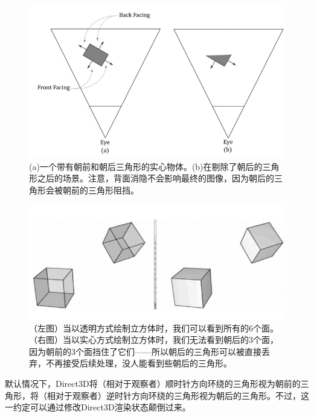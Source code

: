 \documentclass[11pt,a4paper,oldfontcommands]{memoir}
\begin{document}
{\begin{figure}[h]
	\includegraphics[width=\textwidth]{5-31}
	\centering
	\caption{(a)一个带有朝前和朝后三角形的实心物体。(b)在剔除了朝后的三角形之后的场景。注意，背面消隐不会影响最终的图像，因为朝后的三角形会被朝前的三角形阻挡。}
	\label{fig:5-31}
\end{figure}
\begin{figure}[h]
	\includegraphics[width=\textwidth]{5-32}
	\centering
	\caption{（左图）当以透明方式绘制立方体时，我们可以看到所有的6个面。（右图）当以实心方式绘制立方体时，我们无法看到朝后的3个面，因为朝前的3个面挡住了它们——所以朝后的三角形可以被直接丢弃，不再接受后续处理，没人能看到些朝后的三角形。}
	\label{fig:5-32}
\end{figure}
\begin{flushleft}
默认情况下，Direct3D将（相对于观察者）顺时针方向环绕的三角形视为朝前的三角形，将（相对于观察者）逆时针方向环绕的三角形视为朝后的三角形。不过，这一约定可以通过修改Direct3D渲染状态颠倒过来。
\end{flushleft}

}
\end{document}

